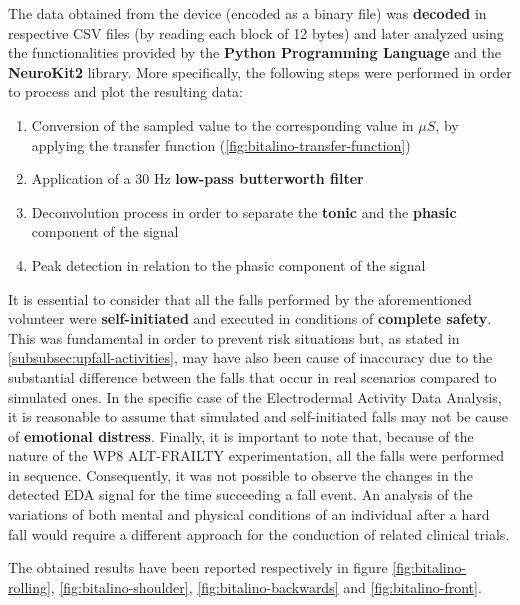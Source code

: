 The data obtained from the device (encoded as a binary file) was \textbf{decoded} in respective CSV files (by reading each block of 12 bytes) and later analyzed using the functionalities provided by the \textbf{Python Programming Language} and the \textbf{NeuroKit2} \cite{neurokit} library. More specifically, the following steps were performed in order to process and plot the resulting data:

\begin{enumerate}
    \item Conversion of the sampled value to the corresponding value in $\mu S$, by applying the transfer function (\ref{fig:bitalino-transfer-function})
    \item Application of a 30 Hz \textbf{low-pass butterworth filter} 
    \item Deconvolution process in order to separate the \textbf{tonic} and the \textbf{phasic} component of the signal
    \item Peak detection in relation to the phasic component of the signal
\end{enumerate}

It is essential to consider that all the falls performed by the aforementioned volunteer were \textbf{self-initiated} and executed in conditions of \textbf{complete safety}. This was fundamental in order to prevent risk situations but, as stated in \ref{subsubsec:upfall-activities}, may have also been cause of inaccuracy due to the substantial difference between the falls that occur in real scenarios compared to simulated ones. In the specific case of the Electrodermal Activity Data Analysis, it is reasonable to assume that simulated and self-initiated falls may not be cause of \textbf{emotional distress}. Finally, it is important to note that, because of the nature of the WP8 ALT-FRAILTY experimentation, all the falls were performed in sequence. Consequently, it was not possible to observe the changes in the detected EDA signal for the time succeeding a fall event. An analysis of the variations of both mental and physical conditions of an individual after a hard fall would require a different approach for the conduction of related clinical trials. 

The obtained results have been reported respectively in figure \ref{fig:bitalino-rolling}, \ref{fig:bitalino-shoulder}, \ref{fig:bitalino-backwards} and \ref{fig:bitalino-front}.

